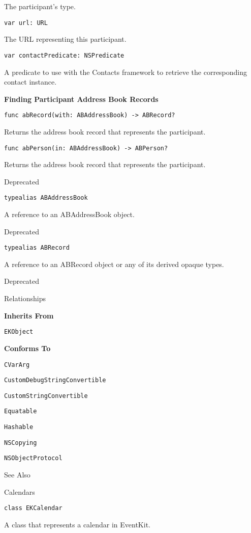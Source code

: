 \documentclass{article}
\begin{document}
The participant's type.

\texttt{var url: URL}

The URL representing this participant.

\texttt{var contactPredicate: NSPredicate}

A predicate to use with the Contacts framework to retrieve the corresponding contact instance.

\textbf{Finding Participant Address Book Records}

\texttt{func abRecord(with: ABAddressBook) -> ABRecord?}

Returns the address book record that represents the participant.

\texttt{func abPerson(in: ABAddressBook) -> ABPerson?}

Returns the address book record that represents the participant.

Deprecated

\texttt{typealias ABAddressBook}

A reference to an ABAddressBook object.

Deprecated

\texttt{typealias ABRecord}

A reference to an ABRecord object or any of its derived opaque types.

Deprecated

Relationships

\textbf{Inherits From}

\texttt{EKObject}

\textbf{Conforms To}

\texttt{CVarArg}

\texttt{CustomDebugStringConvertible}

\texttt{CustomStringConvertible}

\texttt{Equatable}

\texttt{Hashable}

\texttt{NSCopying}

\texttt{NSObjectProtocol}

See Also

Calendars

\texttt{class EKCalendar}

A class that represents a calendar in EventKit.

\newpage
\end{document}
